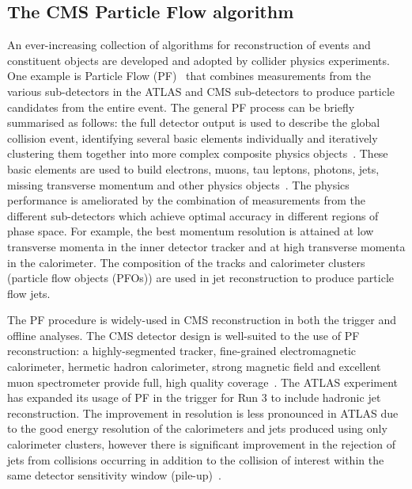 \subsection{The CMS Particle Flow algorithm} \label{sec:Algorithms_PFlow}

An ever-increasing collection of algorithms for reconstruction of events and constituent objects are developed and adopted by collider physics experiments. 
One example is Particle Flow (PF)~\cite{sirunyan2017pflowcms} that combines measurements from the various sub-detectors in the ATLAS and CMS sub-detectors to produce particle candidates from the entire event. The general PF process can be briefly summarised as follows: the full detector output is used to describe the global collision event, identifying several basic elements individually and iteratively clustering them together into more complex composite physics objects~\cite{CMS:2020uim,CMS:2018rym,CMS:2014pgm}. 
These basic elements are used to build electrons, muons, tau leptons, photons, jets, missing transverse momentum and other physics objects~\cite{CMS:2018jrd,CMS:2016lmd,CMS:2019ctu}. 
The physics performance is ameliorated by the combination of measurements from the different sub-detectors which achieve optimal accuracy in different regions of phase space. 
For example, the best momentum resolution is attained at low transverse momenta in the inner detector tracker and at high transverse momenta in the calorimeter. The composition of the tracks and calorimeter clusters (particle flow objects (PFOs)) are used in jet reconstruction to produce particle flow jets.

The PF procedure is widely-used in CMS reconstruction in both the trigger and offline analyses. The CMS detector design is well-suited to the use of PF reconstruction: a highly-segmented tracker, fine-grained electromagnetic calorimeter, hermetic hadron calorimeter, strong magnetic field and excellent muon spectrometer provide full, high quality coverage~\cite{sirunyan2017pflowcms}. The ATLAS experiment has expanded its usage of PF in the trigger for Run 3 to include hadronic jet reconstruction. The improvement in resolution is less pronounced in ATLAS due to the good energy resolution of the calorimeters and jets produced using only calorimeter clusters, however there is significant improvement in the rejection of jets from collisions occurring in addition to the collision of interest within the same detector sensitivity window (pile-up)~\cite{ATLASTriggerRun3,ATLASJetPFlow}. 

